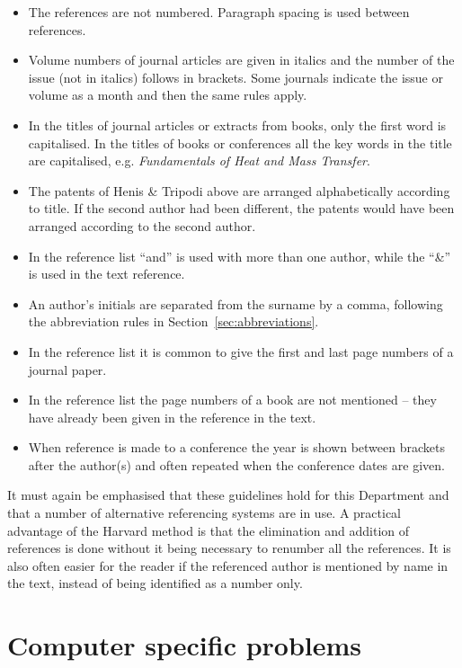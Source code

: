 \documentclass[a5paper, 10pt]{article}
\begin{document}
\begin{itemize}
\item The references are not numbered.  Paragraph spacing is used
  between references.
\item Volume numbers of journal articles are given in italics and the
  number of the issue (not in italics) follows in brackets.  Some
  journals indicate the issue or volume as a month and then the same
  rules apply.
\item In the titles of journal articles or extracts from books, only
  the first word is capitalised.  In the titles of books or
  conferences all the key words in the title are capitalised, e.g.
  \textit{Fundamentals of Heat and Mass Transfer}.
\item The patents of Henis \& Tripodi above are arranged
  alphabetically according to title.  If the second author had been
  different, the patents would have been arranged according to the
  second author.
\item In the reference list ``and'' is used with more than one author,
  while the ``\&'' is used in the text reference.
\item An author's initials are separated from the surname by a comma,
  following the abbreviation rules in Section~\ref{sec:abbreviations}.
\item In the reference list it is common to give the first and last
  page numbers of a journal paper.
\item In the reference list the page numbers of a book are not
  mentioned -- they have already been given in the reference in the
  text.
\item When reference is made to a conference the year is shown between
  brackets after the author(s) and often repeated when the conference
  dates are given.
\end{itemize}

It must again be emphasised that these guidelines hold for this
Department and that a number of alternative referencing systems are in
use.  A practical advantage of the Harvard method is that the
elimination and addition of references is done without it being
necessary to renumber all the references.  It is also often easier for
the reader if the referenced author is mentioned by name in the text,
instead of being identified as a number only.

\section{Computer specific problems}
\label{app:computerproblems}
\end{document}
